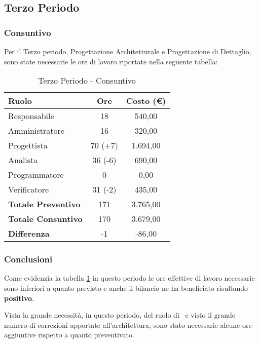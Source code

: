 \documentclass[../PianoDiProgetto_v3.0.0.tex]{subfiles}
\begin{document}
	\subsection{Terzo Periodo}
		\subsubsection{Consuntivo}
		Per il Terzo periodo, Progettazione Architetturale e Progettazione di Dettaglio, sono state necessarie le ore di lavoro riportate nella seguente tabella:
		
		\begin{table}[h]
				\centering
				\begin{tabular}{l * {2}{c}}
					\toprule
					\textbf{Ruolo} & \textbf{Ore} & \textbf{Costo (\euro{})} \\
					\midrule
					Responsabile & 18 & 540,00 \\

					Amministratore & 16 & 320,00 \\

					Progettista & 70 (+7) & 1.694,00 \\

					Analista & 36 (-6) & 690,00 \\		

					Programmatore & 0 & 0,00 \\		

					Verificatore & 31 (-2) & 435,00 \\				
					\midrule		
					\textbf{Totale Preventivo} & 171 & 3.765,00 \\
					\textbf{Totale Consuntivo} & 170 & 3.679,00 \\
					\midrule
					\textbf{Differenza} & -1 & -86,00 \\
					\bottomrule
				\end{tabular}
				\caption{Terzo Periodo - Consuntivo}
				\label{tab:consuntivo3}	
			\end{table}
		
		\subsubsection{Conclusioni}
		Come evidenzia la tabella \ref{tab:consuntivo3} in questo periodo le ore effettive di lavoro necessarie sono inferiori a quanto previsto e anche il bilancio ne ha beneficiato risultando \textbf{positivo}.
		
			Vista la grande necessità, in questo periodo, del ruolo di \progettista\ e visto il grande numero di correzioni apportate all'architettura, sono stato necessarie alcune ore aggiuntive rispetto a quanto preventivato. 
			
\end{document}
